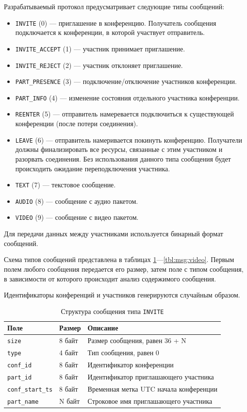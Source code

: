 Разрабатываемый протокол предусматривает следующие типы сообщений:
\begin{itemize}[label=---]
    \item \texttt{INVITE} (0) --- приглашение в конференцию. Получатель сообщения подключается к конференции, в которой участвует отправитель.
    \item \texttt{INVITE\_ACCEPT} (1) --- участник принимает приглашение.
    \item \texttt{INVITE\_REJECT} (2) --- участник отклоняет приглашение.
    \item \texttt{PART\_PRESENCE} (3) --- подключение/отключение участников конференции.
    \item \texttt{PART\_INFO} (4) --- изменение состояния отдельного участника конференции.
    \item \texttt{REENTER} (5) --- отправитель намеревается подключиться к существующей конференции (после потери соединения).
    \item \texttt{LEAVE} (6) --- отправитель намеривается покинуть конференцию. Получатели должны финализировать все ресурсы, связанные с этим участником и разорвать соединения. Без использования данного типа сообщения будет происходить ожидание переподключения участника.
    \item \texttt{TEXT} (7) --- текстовое сообщение.
    \item \texttt{AUDIO} (8) --- сообщение с аудио пакетом.
    \item \texttt{VIDEO} (9) --- сообщение с видео пакетом.
\end{itemize}

Для передачи данных между участниками используется бинарный формат сообщений.

Схема типов сообщений представлена в таблицах \ref{tbl:msg:invite}---\ref{tbl:msg:video}.
Первым полем любого сообщения передается его размер, затем поле с типом сообщения, в зависимости от которого происходит анализ содержимого сообщения.

Идентификаторы конференций и участников генерируются случайным образом.

\begin{table}[H]
  \centering
  \caption{Структура сообщения типа \texttt{INVITE}}
  \label{tbl:msg:invite}
  \begin{tabular}{|l|l|l|}
    \hline
    \textbf{Поле} & \textbf{Размер} & \textbf{Описание} \\ \hline
    \texttt{size} & 8 байт & Размер сообщения, равен 36 + N \\ \hline
    \texttt{type} & 4 байт & Тип сообщения, равен 0 \\ \hline
    \texttt{conf\_id} & 8 байт & Идентификатор конференции \\ \hline
    \texttt{part\_id} & 8 байт & Идентификатор приглашающего участника \\ \hline
    \texttt{conf\_start\_ts} & 8 байт & Временная метка UTC начала конференции \\ \hline
    \texttt{part\_name} & N байт & Строковое имя приглашающего участника \\ \hline
  \end{tabular}
\end{table}

